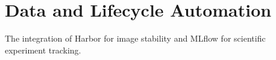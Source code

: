 \section{Data and Lifecycle Automation}

The integration of Harbor for image stability and MLflow for scientific experiment tracking.
